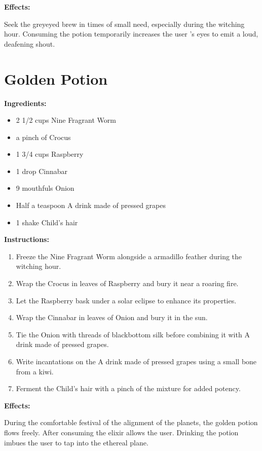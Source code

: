 \documentclass{article}
\begin{document}
\textbf{Effects:}

Seek the greyeyed brew in times of small need, especially during the witching hour. Consuming the potion temporarily increases the user 's eyes to emit a loud, deafening shout.

\newpage
\section*{Golden Potion}

\textbf{Ingredients:}

\begin{itemize}
  \item 2 1/2 cups Nine Fragrant Worm
  \item a pinch of Crocus
  \item 1 3/4 cups Raspberry
  \item 1 drop Cinnabar
  \item 9 mouthfuls Onion
  \item Half a teaspoon A drink made of pressed grapes
  \item 1 shake Child's hair
\end{itemize}

\textbf{Instructions:}

\begin{enumerate}
  \item Freeze the Nine Fragrant Worm alongside a armadillo feather during the witching hour.
  \item Wrap the Crocus in leaves of Raspberry and bury it near a roaring fire.
  \item Let the Raspberry bask under a solar eclipse to enhance its properties.
  \item Wrap the Cinnabar in leaves of Onion and bury it in the sun.
  \item Tie the Onion with threads of blackbottom silk before combining it with A drink made of pressed grapes.
  \item Write incantations on the A drink made of pressed grapes using a small bone from a kiwi.
  \item Ferment the Child's hair with a pinch of the mixture for added potency.
\end{enumerate}

\textbf{Effects:}

During the comfortable festival of the alignment of the planets, the golden potion flows freely. After consuming the elixir allows the user. Drinking the potion imbues the user to tap into the ethereal plane.
\end{document}
